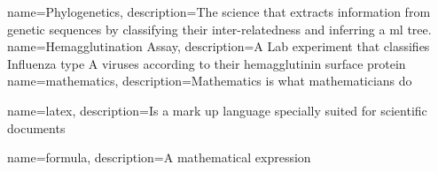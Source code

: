 
{
    name=Phylogenetics,
    description={The science that extracts information from genetic sequences by classifying their inter-relatedness and inferring a \acrshort{ml} tree.}
}
{
    name=Hemagglutination Assay,
    description={A Lab experiment that classifies Influenza type A viruses according to their hemagglutinin surface protein}
}
{
    name=mathematics,
    description={Mathematics is what mathematicians do}
}

{
    name=latex,
    description={Is a mark up language specially suited for 
scientific documents}
}


{
    name=formula,
    description={A mathematical expression}
}






